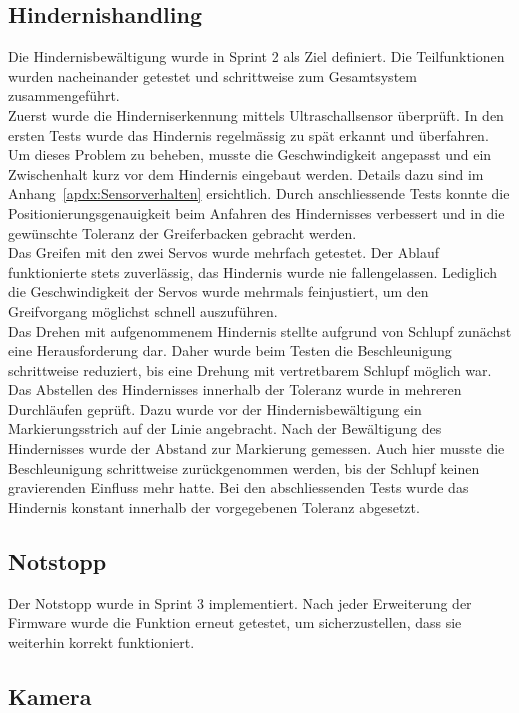 \documentclass[main.tex]{subfiles} %
\begin{document}
\subsection*{Hindernishandling}
Die Hindernisbewältigung wurde in Sprint 2 als Ziel definiert. Die
Teilfunktionen wurden nacheinander getestet und schrittweise zum
Gesamtsystem zusammengeführt.\\
Zuerst wurde die Hinderniserkennung mittels Ultraschallsensor
überprüft. In den ersten Tests wurde das Hindernis regelmässig zu spät erkannt
und überfahren. Um dieses Problem zu beheben, musste die
Geschwindigkeit angepasst und ein Zwischenhalt kurz vor dem Hindernis
eingebaut werden.
Details dazu sind im Anhang~\ref{apdx:Sensorverhalten} ersichtlich.
Durch anschliessende Tests konnte die Positionierungsgenauigkeit beim Anfahren
des Hindernisses verbessert und in die gewünschte Toleranz der
Greiferbacken gebracht werden.\\
Das Greifen mit den zwei Servos wurde mehrfach getestet. Der Ablauf
funktionierte stets zuverlässig, das Hindernis wurde nie fallengelassen.
Lediglich die Geschwindigkeit der Servos wurde mehrmals feinjustiert,
um den Greifvorgang möglichst schnell auszuführen.\\
Das Drehen mit aufgenommenem Hindernis stellte aufgrund von Schlupf
zunächst eine Herausforderung dar. Daher wurde beim Testen die
Beschleunigung schrittweise
reduziert, bis eine Drehung mit vertretbarem Schlupf möglich war.\\
Das Abstellen des Hindernisses innerhalb der Toleranz wurde in
mehreren Durchläufen geprüft. Dazu wurde vor der Hindernisbewältigung
ein Markierungsstrich
auf der Linie angebracht. Nach der Bewältigung des Hindernisses wurde
der Abstand zur Markierung gemessen. Auch hier musste die
Beschleunigung schrittweise
zurückgenommen werden, bis der Schlupf keinen gravierenden Einfluss
mehr hatte. Bei den abschliessenden Tests wurde das Hindernis
konstant innerhalb der
vorgegebenen Toleranz abgesetzt.

\subsection*{Notstopp}
Der Notstopp wurde in Sprint 3 implementiert. Nach jeder Erweiterung
der Firmware wurde die Funktion erneut getestet, um sicherzustellen,
dass sie weiterhin korrekt funktioniert.

\subsection*{Kamera}
\end{document}
